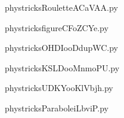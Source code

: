     \newcommand{\CaptionFigRouletteACaVAA}{<+Type your caption here+>}
    \begin{center}
        
    \end{center}
    phystricksRouletteACaVAA.py

    

    \clearpage
    


    \newcommand{\CaptionFigfigureCFoZCYe}{<+Type your caption here+>}
    \begin{center}
        
    \end{center}
    phystricksfigureCFoZCYe.py

    

    \clearpage
    


    \newcommand{\CaptionFigOHDIooDdupWC}{<+Type your caption here+>}
    \begin{center}
        
    \end{center}
    phystricksOHDIooDdupWC.py

    

    \clearpage
    


    \newcommand{\CaptionFigKSLDooMnmoPU}{<+Type your caption here+>}
    \begin{center}
        
    \end{center}
    phystricksKSLDooMnmoPU.py

    

    \clearpage
    


    \newcommand{\CaptionFigUDKYooKlVbjh}{<+Type your caption here+>}
    \begin{center}
        
    \end{center}
    phystricksUDKYooKlVbjh.py

    

    \clearpage
    


    \newcommand{\CaptionFigParaboleiLbviP}{<+Type your caption here+>}
    \begin{center}
        
    \end{center}
    phystricksParaboleiLbviP.py

